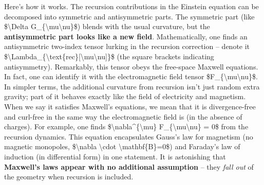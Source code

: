 \documentclass[
]{article}
\begin{document}
{Here's how it works. The recursion contributions in the Einstein
equation can be decomposed into symmetric and antisymmetric parts. The
symmetric part (like \$\textbackslash Delta
G\_\{\textbackslash mu\textbackslash nu\}\$) blends with the usual
curvature, but the \textbf{antisymmetric part looks like a new field}.
Mathematically, one finds an antisymmetric two-index tensor lurking in
the recursion correction -- denote it
\$\textbackslash Lambda\_\{\textbackslash text\{rec\}{[}\textbackslash mu\textbackslash nu{]}\}\$
(the square brackets indicating antisymmetry). Remarkably, this tensor
obeys the free-space Maxwell equations. In fact, one can identify it
with the electromagnetic field tensor
\$F\_\{\textbackslash mu\textbackslash nu\}\$\hspace{0pt}. In simpler
terms, the additional curvature from recursion isn't just random extra
gravity; part of it behaves exactly like the field of electricity and
magnetism. When we say it satisfies Maxwell's equations, we mean that it
is divergence-free and curl-free in the same way the electromagnetic
field is (in the absence of charges). For example, one finds
\$\textbackslash nabla\^{}\{\textbackslash mu\}
F\_\{\textbackslash mu\textbackslash nu\} = 0\$ from the recursion
dynamics\hspace{0pt}. This equation encapsulates Gauss's law for
magnetism (no magnetic monopoles, \$\textbackslash nabla
\textbackslash cdot \textbackslash mathbf\{B\}=0\$) and Faraday's law of
induction (in differential form) in one statement. It is astonishing
that \textbf{Maxwell's laws appear with no additional assumption} --
they \emph{fall out} of the geometry when recursion is included.

}
\end{document}
